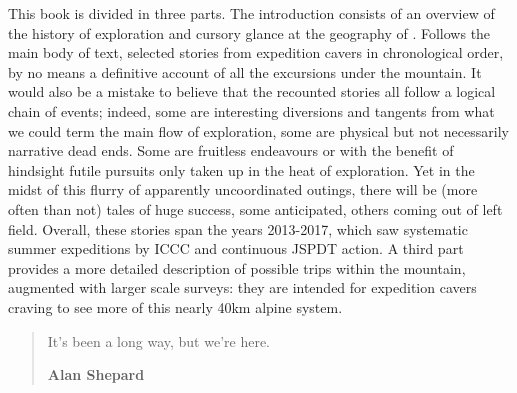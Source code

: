 
\mydelimiter

This book is divided in three parts. The introduction consists of an overview of the history of exploration and cursory glance at the geography of . Follows the main body of text, selected stories from expedition cavers in chronological order, by no means a definitive account of all the excursions under the mountain. It would also be a mistake to believe that the recounted stories all follow a logical chain of events; indeed, some are interesting diversions and tangents from what we could term the main flow of exploration, some are physical but not necessarily narrative dead ends. Some are fruitless endeavours or with the benefit of hindsight futile pursuits only taken up in the heat of exploration. Yet in the midst of this flurry of apparently uncoordinated outings, there will be (more often than not) tales of huge success, some anticipated, others coming out of left field. Overall, these stories span the years 2013-2017, which saw systematic summer expeditions by ICCC and continuous JSPDT action. A third part provides a more detailed description of possible trips within the mountain, augmented with larger scale surveys: they are intended for expedition cavers craving to see more of this nearly 40km alpine system. 

\mydelimiter

\begin{quote}
It's been a long way, but we're here.
 
\raggedleft\normalsize\sffamily\textbf{Alan Shepard} \par\end{quote}

